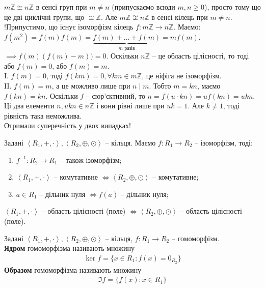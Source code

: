 \documentclass{math_library}
\begin{document}
\begin{example}
$m\mathbb{Z} \cong n \mathbb{Z}$ в сенсі груп при $m \neq n$ (припускаємо всюди $m,n \geq 0$), просто тому що це дві циклічні групи, що $\cong \mathbb{Z}$. Але $m\mathbb{Z} \not\cong n \mathbb{Z}$ в сенсі кілець при $m \neq n$.\\
!Припустимо, що існує ізоморфізм кілець $f \colon m \mathbb{Z} \to n \mathbb{Z}$. Маємо:\\
$f(m^2) = f(m)f(m) = \underbrace{f(m) + \dots + f(m)}_{m \text{ разів}} = m f(m)$.\\
$\implies f(m)(f(m)-m)) = 0$. Оскільки $n \mathbb{Z}$ -- це область цілісності, то тоді або $f(m) = 0$, або $f(m) = m$.\\
I. $f(m) = 0$, тоді $f(km) = 0, \forall km \in m\mathbb{Z}$, це ніфіга не ізоморфізм.\\
II. $f(m) = m$, а це можливо лише при $n \mid m$. Тобто $m = kn$, маємо $f(kn) = kn$. Оскільки $f$ -- сюр'єктивний, то $n = f(u \cdot kn) = u f(kn) = ukn$. Ці два елементи $n, ukn \in n \mathbb{Z}$ і вони рівні лише при $uk = 1$. Але $k \neq 1$, тоді рівність така неможлива.\\
Отримали суперечність у двох випадках!
\end{example}

\begin{theorem}
Задані $\left<R_1, +, \cdot\right>, \left<R_2, \oplus, \odot \right>$ -- кільця. Маємо $f \colon R_1 \to R_2$ -- ізоморфізм, тоді:
\begin{enumerate}[nosep,wide=0pt,label={\arabic*)}]
\item $f^{-1} \colon R_2 \to R_1$ -- також ізоморфізм;
\item $\left< R_1, +, \cdot \right>$ -- комутативне $\iff \left< R_2, \oplus, \odot \right>$ -- комутативне;
\item $a \in R_1$ -- дільник нуля $\iff f(a)$ -- дільник нуля;
\end{enumerate}
\end{theorem}

\begin{corollary}
$\left< R_1, +, \cdot \right>$ -- область цілісності (поле) $\iff \left< R_2, \oplus, \odot \right>$ -- область цілісності (поле).
\end{corollary}

\begin{definition}
Задані $\left<R_1, +, \cdot \right>,\left<R_2, \oplus, \odot \right>$ -- кільця, $f \colon R_1 \to R_2$ -- гомоморфізм.\\
\textbf{Ядром} гомоморфізма називають множину
\begin{align*}
\ker f = \{ x \in R_1: f(x) = 0_{R_2} \}
\end{align*}
\textbf{Образом} гомоморфізма називають множину
\begin{align*}
\Im f = \{f(x) : x \in R_1\}
\end{align*}
\end{definition}
\end{document}
